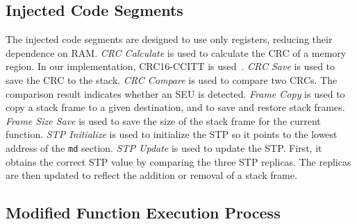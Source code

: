 \subsection{Injected Code Segments}
\vspace{-5pt}
The injected code segments are designed to use only registers, reducing their dependence on RAM. \textit{CRC Calculate} is used to calculate the CRC of a memory region. In our implementation, CRC16-CCITT is used~\cite{crc16}. \textit{CRC Save} is used to save the CRC to the stack. \textit{CRC Compare} is used to compare two CRCs. The comparison result indicates whether an SEU is detected. \textit{Frame Copy} is used to copy a stack frame to a given destination, and to save and restore stack frames. \textit{Frame Size Save} is used to save the size of the stack frame for the current function. \textit{STP Initialize} is used to initialize the STP so it points to the lowest address of the \texttt{md} section. \textit{STP Update} is used to update the STP. First, it obtains the correct STP value by comparing the three STP replicas. The replicas are then updated to reflect the addition or removal of a stack frame.
\vspace{-15pt}
\subsection{Modified Function Execution Process}
\vspace{-5pt}
